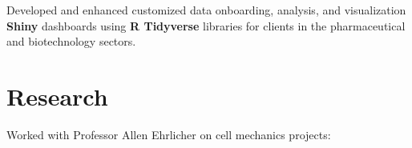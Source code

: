 \documentclass[]{jidicula-resume}
\begin{document}
\vspace{\topsep} %
\begin{tightemize}
\item Developed and enhanced customized data onboarding, analysis, and
  visualization \textbf{Shiny} dashboards using \textbf{R Tidyverse} libraries
  for clients in the pharmaceutical and biotechnology sectors.
\end{tightemize}
\sectionsep{}

\section{Research}
Worked with Professor Allen Ehrlicher on cell mechanics projects:
\end{document}
